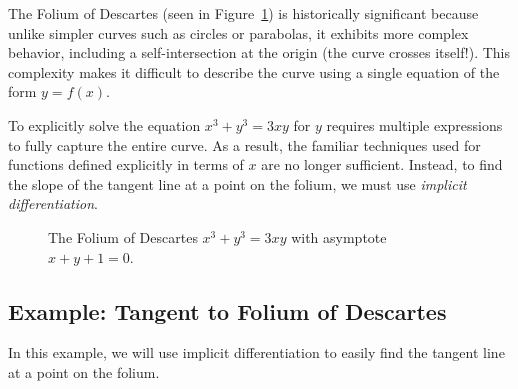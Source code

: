 The Folium of Descartes (seen in Figure~\ref{fig:folium_descartes}) is historically significant because unlike simpler curves such as circles or parabolas, it exhibits more complex behavior, including a self-intersection at the origin (the curve crosses itself!). This complexity makes it difficult to describe the curve using a single equation of the form $y = f(x)$.

To explicitly solve the equation $x^3 + y^3 = 3xy$ for $y$ requires multiple expressions to fully capture the entire curve. As a result, the familiar techniques used for functions defined explicitly in terms of $x$ are no longer sufficient. Instead, to find the slope of the tangent line at a point on the folium, we must use \emph{implicit differentiation}.


\begin{figure}[H]
\centering
{}
\caption{The Folium of Descartes $x^3+y^3=3xy$ with asymptote $x+y+1=0$.}
\label{fig:folium_descartes}
\end{figure}

\subsection{Example: Tangent to Folium of Descartes}

In this example, we will use implicit differentiation to easily find 
the tangent line at a point on the folium. 

